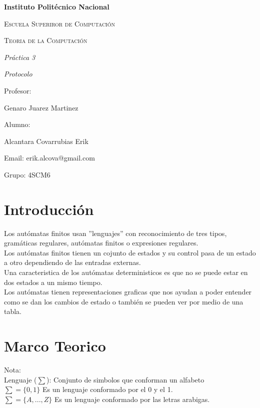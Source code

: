 \documentclass{article}
\begin{document}
\begin{titlepage}
\centering

{\bfseries\LARGE Instituto Polit\'ecnico Nacional \par}
\vspace{1cm}
{\scshape\Large Escuela Superiror de Computaci\'on \par}
\vspace{3cm}
{\scshape\Large Teoria de la Computaci\'on \par}
\vspace{3cm}
{\itshape\Large Pr\'actica 3 \par}
{\itshape\Large Protocolo \par}
\vfill
{\Large Profesor: \par}
{\Large Genaro Juarez Martinez \par}
{\Large Alumno: \par}
{\Large Alcantara Covarrubias Erik \par}
{\Large Email: erik.alcova@gmail.com \par}
{\Large Grupo: 4SCM6\par}
\vfill
\end{titlepage}

\tableofcontents

\newpage

\section{Introducción}
Los autómatas finitos usan ”lenguajes” con reconocimiento de tres tipos, gramáticas regulares, autómatas finitos o expresiones regulares.
\\Los autómatas finitos tienen un cojunto de estados y su control pasa de un estado a otro dependiendo de las
entradas externas. 
\\Una caracteristica de los autómatas deterministicos es que no se puede estar en dos estados a
un mismo tiempo.
\\Los autómatas tienen representaciones graficas que nos ayudan a poder entender como se dan los cambios de estado o también se
pueden ver por medio de una tabla.

\section{Marco Teorico}

    Nota: 
    \\Lenguaje ($\sum$): Conjunto de simbolos que conforman un alfabeto
    \\$\sum = \{ 0, 1\}$ Es un lenguaje conformado por el 0 y el 1.
    \\$\sum = \{A, ..., Z\}$ Es un lenguaje conformado por las letras arabigas.\\
    
\end{document}
